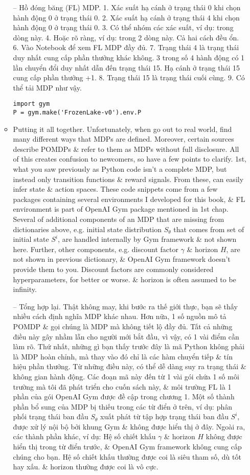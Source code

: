 \documentclass{article}
\begin{document}
\begin{itemize}
\begin{itemize}
        -- {\sf Hồ đóng băng (FL) MDP.} 1. Xác suất hạ cánh ở trạng thái 0 khi chọn hành động 0 ở trạng thái 0. 2. Xác suất hạ cánh ở trạng thái 4 khi chọn hành động 0 ở trạng thái 0. 3. Có thể nhóm các xác suất, ví dụ: trong dòng này. 4. Hoặc rõ ràng, ví dụ: trong 2 dòng này. Cả hai cách đều ổn. 6. Vào Notebook để xem FL MDP đầy đủ. 7. Trạng thái 4 là trạng thái duy nhất cung cấp phần thưởng khác không. 3 trong số 4 hành động có 1 lần chuyển đổi duy nhất dẫn đến trạng thái 15. Hạ cánh ở trạng thái 15 cung cấp phần thưởng +1. 8. Trạng thái 15 là trạng thái cuối cùng. 9. Có thể tải MDP như vậy.
        \begin{verbatim}
import gym
P = gym.make('FrozenLake-v0').env.P
        \end{verbatim}
        \item {\sf Putting it all together.} Unfortunately, when go out to real world, find many different ways that MDPs are defined. Moreover, certain sources describe POMDPs \& refer to them as MDPs without full disclosure. All of this creates confusion to newcomers, so have a few points to clarify. 1st, what you saw previously as Python code isn't a complete MDP, but instead only transition functions \& reward signals. From these, can easily infer state \& action spaces. These code snippets come from a few packages containing several environments I developed for this book, \& FL environment is part of OpenAI Gym package mentioned in 1st chap. Several of additional components of an MDP that are missing from dictionaries above, e.g. initial state distribution $S_\theta$ that comes from set of initial state $S^i$, are handled internally by Gym framework \& not shown here. Further, other components, e.g. discount factor $\gamma$ \& horizon $H$, are not shown in previous dictionary, \& OpenAI Gym framework doesn't provide them to you. Discount factors are commonly considered hyperparameters, for better or worse. \& horizon is often assumed to be infinity.

        -- {\sf Tổng hợp lại.} Thật không may, khi bước ra thế giới thực, bạn sẽ thấy nhiều cách định nghĩa MDP khác nhau. Hơn nữa, 1 số nguồn mô tả POMDP \& gọi chúng là MDP mà không tiết lộ đầy đủ. Tất cả những điều này gây nhầm lẫn cho người mới bắt đầu, vì vậy, có 1 vài điểm cần làm rõ. Thứ nhất, những gì bạn thấy trước đây là mã Python không phải là MDP hoàn chỉnh, mà thay vào đó chỉ là các hàm chuyển tiếp \& tín hiệu phần thưởng. Từ những điều này, có thể dễ dàng suy ra trạng thái \& không gian hành động. Các đoạn mã này đến từ 1 vài gói chứa 1 số môi trường mà tôi đã phát triển cho cuốn sách này, \& môi trường FL là 1 phần của gói OpenAI Gym được đề cập trong chương 1. Một số thành phần bổ sung của MDP bị thiếu trong các từ điển ở trên, ví dụ: phân phối trạng thái ban đầu $S_\theta$ xuất phát từ tập hợp trạng thái ban đầu $S^i$, được xử lý nội bộ bởi khung Gym \& không được hiển thị ở đây. Ngoài ra, các thành phần khác, ví dụ: Hệ số chiết khấu $\gamma$ \& horizon $H$ không được hiển thị trong từ điển trước, \& OpenAI Gym framework không cung cấp chúng cho bạn. Hệ số chiết khấu thường được coi là siêu tham số, dù tốt hay xấu. \& horizon thường được coi là vô cực.


\end{itemize}
\end{itemize}
\end{document}
